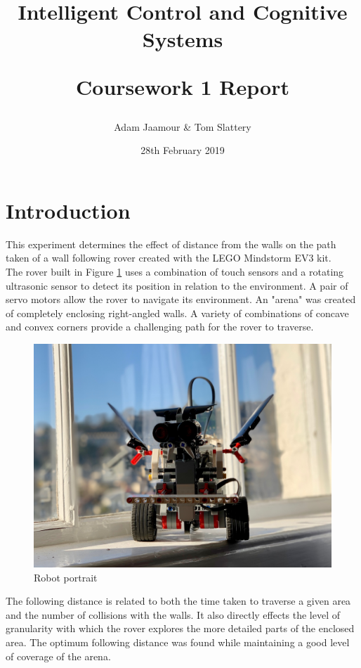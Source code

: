 \documentclass[a4paper,12pt,twocolumn]{article}
\title{
    Intelligent Control and Cognitive Systems\\
    \begin{large}
        Coursework 1 Report
    \end{large}
}
\author{Adam Jaamour & Tom Slattery}
\date{28th February 2019}
\begin{document}
\maketitle
\thispagestyle{empty}
\clearpage
\setcounter{page}{1}


\section{Introduction}

This experiment determines the effect of distance from the walls on the path taken of a wall following rover created with the LEGO Mindstorm EV3 kit.\\

The rover built in Figure \ref{fig:robot-portrait} uses a combination of touch sensors and a rotating ultrasonic sensor to detect its position in relation to the environment. A pair of servo motors allow the rover to navigate its environment. An "arena" was created of completely enclosing right-angled walls. A variety of combinations of concave and convex corners provide a challenging path for the rover to traverse.

\begin{figure}[ht]
\centering
\includegraphics[width=\linewidth]{figures/robot_portrait.jpeg}
\caption{Robot portrait}
  \label{fig:robot-portrait}
\end{figure}

The following distance is related to both the time taken to traverse a given area and the number of collisions with the walls. It also directly effects the level of granularity with which the rover explores the more detailed parts of the enclosed area. The optimum following distance was found while maintaining a good level of coverage of the arena.\\
\end{document}

